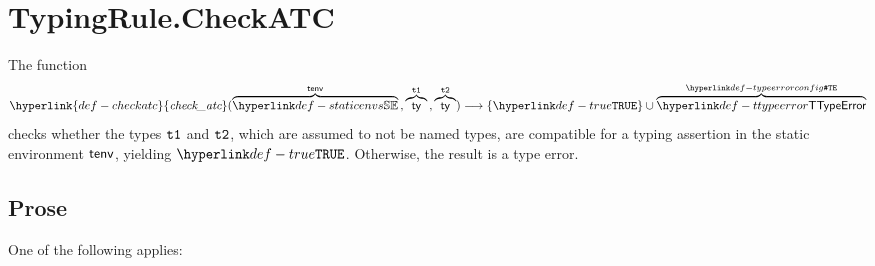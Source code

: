 \documentclass{book}
\newcommand\ProseOtherwiseTypeError[0]{Otherwise, the result is a type error.}
\newcommand\checkatc[0]{\hyperlink{def-checkatc}{\textfunc{check\_atc}}}
\begin{document}
\section{TypingRule.CheckATC \label{sec:TypingRule.CheckATC}}
\hypertarget{def-checkatc}{}
The function
\[
  \checkatc(\overname{\staticenvs}{\tenv} \aslsep \overname{\ty}{\vtone} \aslsep \overname{\ty}{\vttwo}) \aslto
  \{\True\} \cup \overname{\TTypeError}{\TypeErrorConfig}
\]
checks whether the types $\texttt{t1}$ and $\texttt{t2}$, which are assumed to not be named types,
are compatible for a typing assertion in the static environment $\textsf{tenv}$, yielding $\True$.
\ProseOtherwiseTypeError

\subsection{Prose}
One of the following applies:
\end{document}
